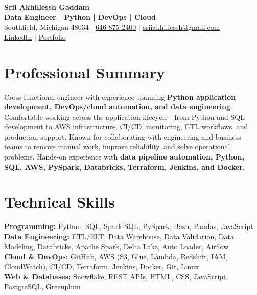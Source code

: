 \documentclass[letterpaper,10pt]{article}
\begin{document}
\fontsize{9.35pt}{10.45pt}\selectfont

\begin{center}
    {\LARGE \textbf{Srii Akhillessh Gaddam}} \\[-1pt]
    \textbf{Data Engineer | Python | DevOps | Cloud} \\[2pt]
    Southfield, Michigan 48034 $|$
    \href{tel:6468752400}{646-875-2400} $|$
    \href{mailto:sriiakhillessh@gmail.com}{sriiakhillessh@gmail.com} \\[1pt]
    \href{https://www.linkedin.com/in/srii-akhiilessh-gaddam-b48668191/}{LinkedIn} $|$
    \href{https://sriiakhillesshg.github.io/portfolio/}{Portfolio}
\end{center}
\vspace{-8pt}

\section{Professional Summary}
\small{Cross-functional engineer with experience spanning \textbf{Python application development, DevOps/cloud automation, and data engineering}. Comfortable working across the application lifecycle - from Python and SQL development to AWS infrastructure, CI/CD, monitoring, ETL workflows, and production support. Known for collaborating with engineering and business teams to remove manual work, improve reliability, and solve operational problems. Hands-on experience with \textbf{data pipeline automation, Python, SQL, AWS, PySpark, Databricks, Terraform, Jenkins, and Docker}.}

\section{Technical Skills}
\small{
\textbf{Programming:} Python, SQL, Spark SQL, PySpark, Bash, Pandas, JavaScript \\
\textbf{Data Engineering:} ETL/ELT, Data Warehouse, Data Validation, Data Modeling, Databricks, Apache Spark, Delta Lake, Auto Loader, Airflow \\
\textbf{Cloud \& DevOps:} GitHub, AWS (S3, Glue, Lambda, Redshift, IAM, CloudWatch), CI/CD, Terraform, Jenkins, Docker, Git, Linux \\
\textbf{Web \& Databases:} Snowflake, REST APIs, HTML, CSS, JavaScript, PostgreSQL, Greenplum
}
\end{document}
